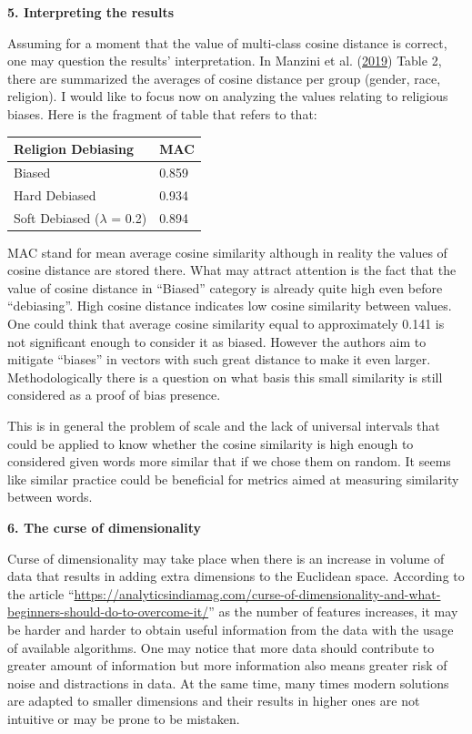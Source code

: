 \documentclass[12pt,]{book}
\begin{document}
\textbf{5. Interpreting the results}

Assuming for a moment that the value of multi-class cosine distance is
correct, one may question the results' interpretation. In Manzini et al.
(\protect\hyperlink{ref-manzini2019black}{2019}) Table 2, there are
summarized the averages of cosine distance per group (gender, race,
religion). I would like to focus now on analyzing the values relating to
religious biases. Here is the fragment of table that refers to that:

\begin{longtable}[]{@{}ll@{}}
\toprule
Religion Debiasing & MAC\tabularnewline
\midrule
\endhead
Biased & 0.859\tabularnewline
Hard Debiased & 0.934\tabularnewline
Soft Debiased (\(\lambda\) = 0.2) & 0.894\tabularnewline
\bottomrule
\end{longtable}

MAC stand for mean average cosine similarity although in reality the
values of cosine distance are stored there. What may attract attention
is the fact that the value of cosine distance in ``Biased'' category is
already quite high even before ``debiasing''. High cosine distance
indicates low cosine similarity between values. One could think that
average cosine similarity equal to approximately 0.141 is not
significant enough to consider it as biased. However the authors aim to
mitigate ``biases'' in vectors with such great distance to make it even
larger. Methodologically there is a question on what basis this small
similarity is still considered as a proof of bias presence.

This is in general the problem of scale and the lack of universal
intervals that could be applied to know whether the cosine similarity is
high enough to considered given words more similar that if we chose them
on random. It seems like similar practice could be beneficial for
metrics aimed at measuring similarity between words.

\textbf{6. The curse of dimensionality}

Curse of dimensionality may take place when there is an increase in
volume of data that results in adding extra dimensions to the Euclidean
space. According to the article
``\url{https://analyticsindiamag.com/curse-of-dimensionality-and-what-beginners-should-do-to-overcome-it/}''
as the number of features increases, it may be harder and harder to
obtain useful information from the data with the usage of available
algorithms. One may notice that more data should contribute to greater
amount of information but more information also means greater risk of
noise and distractions in data. At the same time, many times modern
solutions are adapted to smaller dimensions and their results in higher
ones are not intuitive or may be prone to be mistaken.
\end{document}
